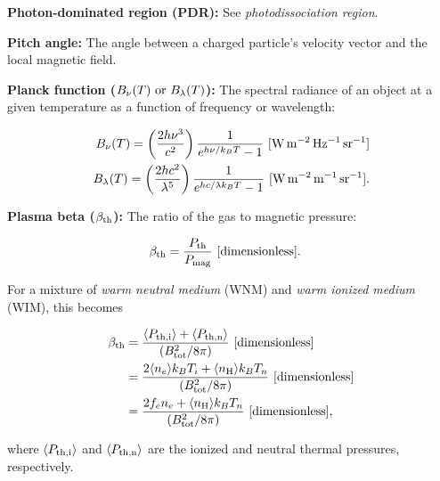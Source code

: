 \documentclass[a4paper,10pt]{article}
\begin{document}
{\noindent}\textbf{Photon-dominated region (PDR):} See \textit{photodissociation region}.

{\noindent}\textbf{Pitch angle:} The angle between a charged particle's velocity vector and the local magnetic field.

{\noindent}\textbf{Planck function ($B_\nu(T)~{\rm or}~B_\lambda(T)$):} The spectral radiance of an object at a given temperature as a function of frequency or wavelength:

\begin{align*}
    B_\nu(T) = \left(\frac{2h\nu^3}{c^2}\right) \frac{1}{e^{h\nu/k_BT}-1} ~ [{\rm W\,m^{-2}\,Hz^{-1}\,sr^{-1}}] \\
    B_\lambda(T) = \left(\frac{2hc^2}{\lambda^5}\right) \frac{1}{e^{hc/\lambda k_BT}-1} ~ [{\rm W\,m^{-2}\,m^{-1}\,sr^{-1}}].
\end{align*}

{\noindent}\textbf{Plasma beta ($\beta_{\rm th}$):} The ratio of the gas to magnetic pressure:

\begin{align*}
    \beta_{\rm th} &= \frac{P_{\rm th}}{P_{\rm mag}} ~ [{\rm dimensionless}].
\end{align*}

{\noindent}For a mixture of \textit{warm neutral medium} (WNM) and \textit{warm ionized medium} (WIM), this becomes

\begin{align*}
\beta_{\rm th} &= \frac{ \langle P_{\rm th,i}\rangle + \langle P_{\rm th,n}\rangle }{(B_{\rm tot}^2/8\pi)} ~ [{\rm dimensionless}] \\
                      &= \frac{2\langle n_e\rangle k_BT_i + \langle n_{\rm H}\rangle k_BT_n}{(B_{\rm tot}^2/8\pi)}  ~ [{\rm dimensionless}] \\
                      &= \frac{2f_en_e+ \langle n_{\rm H}\rangle k_BT_n}{(B_{\rm tot}^2/8\pi)}  ~ [{\rm dimensionless}],
\end{align*}

{\noindent}where $\langle P_{\rm th,i}\rangle$ and $\langle P_{\rm th,n}\rangle$ are the ionized and neutral thermal pressures, respectively.
\end{document}

